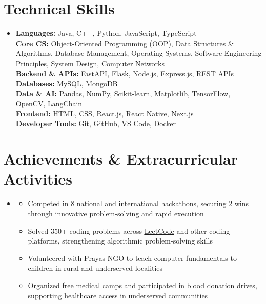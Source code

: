 \documentclass[letterpaper,11pt]{article}
\newcommand{\resumeItem}[1]{
    \item\small{#1}
}
\newcommand{\resumeSubHeadingListStart}{
    \begin{itemize}[
        leftmargin=0.15in,
        label={},
        topsep=0pt,
        partopsep=0pt,
        parsep=0pt,
        itemsep=2pt
    ]
}
\newcommand{\resumeSubHeadingListEnd}{
    \end{itemize}
}
\newcommand{\resumeItemListStart}{
    \begin{itemize}[
        leftmargin=0.18in,
        topsep=0pt,
        partopsep=0pt,
        parsep=0pt,
        itemsep=0pt
    ]
}
\newcommand{\resumeItemListEnd}{
    \end{itemize}
}
\begin{document}
\section{Technical Skills}

\resumeSubHeadingListStart
    \item
    \small{
        \textbf{Languages:} Java, C++, Python, JavaScript, TypeScript \\
        \textbf{Core CS:} Object-Oriented Programming (OOP), Data Structures \& Algorithms, Database Management, Operating Systems, Software Engineering Principles, System Design, Computer Networks \\
        \textbf{Backend \& APIs:} FastAPI, Flask, Node.js, Express.js, REST APIs \\
        \textbf{Databases:} MySQL, MongoDB \\
        \textbf{Data \& AI:} Pandas, NumPy, Scikit-learn, Matplotlib, TensorFlow, OpenCV, LangChain \\
        \textbf{Frontend:} HTML, CSS, React.js, React Native, Next.js \\
        \textbf{Developer Tools:} Git, GitHub, VS Code, Docker
    }
\resumeSubHeadingListEnd

\section{Achievements \& Extracurricular Activities}

\resumeSubHeadingListStart

    \item
    \resumeItemListStart
        \resumeItem{Competed in 8 national and international hackathons, securing 2 wins through innovative problem-solving and rapid execution}
        \resumeItem{Solved 350+ coding problems across \href{https://leetcode.com/u/saadziaatharkhan/}{\underline{LeetCode}} and other coding platforms, strengthening algorithmic problem-solving skills}
        \resumeItem{Volunteered with Prayas NGO to teach computer fundamentals to children in rural and underserved localities}
        \resumeItem{Organized free medical camps and participated in blood donation drives, supporting healthcare access in underserved communities}
    \resumeItemListEnd

\resumeSubHeadingListEnd


\end{document}

